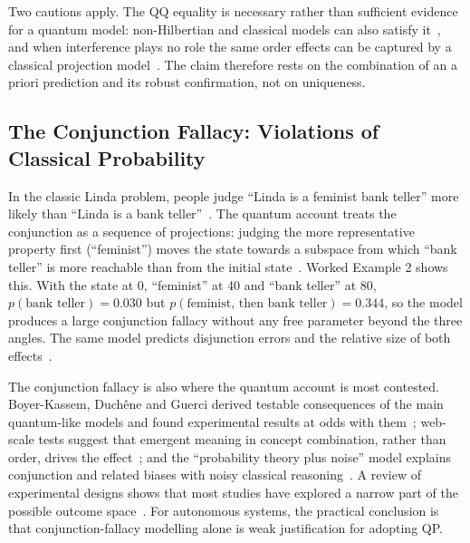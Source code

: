 \documentclass[pdflatex,sn-basic]{sn-jnl}
\begin{document}
Two cautions apply. The QQ equality is necessary rather than sufficient evidence for a quantum model: non-Hilbertian and classical models can also satisfy it~\citep{Aerts2017b,Kellen2018}, and when interference plays no role the same order effects can be captured by a classical projection model~\citep{Moreira2017b}. The claim therefore rests on the combination of an a priori prediction and its robust confirmation, not on uniqueness.

\subsection{The Conjunction Fallacy: Violations of Classical Probability}\label{sec:conj}
In the classic Linda problem, people judge ``Linda is a feminist bank teller'' more likely than ``Linda is a bank teller''~\citep{Tversky1983}. The quantum account treats the conjunction as a sequence of projections: judging the more representative property first (``feminist'') moves the state towards a subspace from which ``bank teller'' is more reachable than from the initial state~\citep{Busemeyer2011}. Worked Example 2 shows this. With the state at 0\textdegree{}, ``feminist'' at 40\textdegree{} and ``bank teller'' at 80\textdegree{}, $p(\text{bank teller}) = 0.030$ but $p(\text{feminist, then bank teller}) = 0.344$, so the model produces a large conjunction fallacy without any free parameter beyond the three angles. The same model predicts disjunction errors and the relative size of both effects~\citep{Busemeyer2011}.

The conjunction fallacy is also where the quantum account is most contested. Boyer-Kassem, Duch\^ene and Guerci derived testable consequences of the main quantum-like models and found experimental results at odds with them~\citep{BoyerKassem2016}; web-scale tests suggest that emergent meaning in concept combination, rather than order, drives the effect~\citep{Aerts2017}; and the ``probability theory plus noise'' model explains conjunction and related biases with noisy classical reasoning~\citep{Costello2014,Costello2018}. A review of experimental designs shows that most studies have explored a narrow part of the possible outcome space~\citep{Veloz2024}. For autonomous systems, the practical conclusion is that conjunction-fallacy modelling alone is weak justification for adopting QP.
\end{document}
